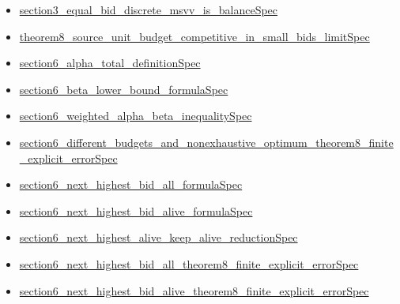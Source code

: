 \documentclass[10pt]{article}
\begin{document}
\begin{itemize}[leftmargin=1.2em]
\begin{itemize}[leftmargin=1.2em]
\item \hyperlink{source-claim-598344e99902b4ae}{section3\_\allowbreak{}equal\_\allowbreak{}bid\_\allowbreak{}discrete\_\allowbreak{}msvv\_\allowbreak{}is\_\allowbreak{}balance\allowbreak{}Spec}
\item \hyperlink{source-claim-87341a8300470279}{theorem8\_\allowbreak{}source\_\allowbreak{}unit\_\allowbreak{}budget\_\allowbreak{}competitive\_\allowbreak{}in\_\allowbreak{}small\_\allowbreak{}bids\_\allowbreak{}limit\allowbreak{}Spec}
\item \hyperlink{source-claim-5bf839489e4b6356}{section6\_\allowbreak{}alpha\_\allowbreak{}total\_\allowbreak{}definition\allowbreak{}Spec}
\item \hyperlink{source-claim-4be68a9e83c05fd2}{section6\_\allowbreak{}beta\_\allowbreak{}lower\_\allowbreak{}bound\_\allowbreak{}formula\allowbreak{}Spec}
\item \hyperlink{source-claim-e7cd47f9b49b64a7}{section6\_\allowbreak{}weighted\_\allowbreak{}alpha\_\allowbreak{}beta\_\allowbreak{}inequality\allowbreak{}Spec}
\item \hyperlink{source-claim-9174699fa51690f5}{section6\_\allowbreak{}different\_\allowbreak{}budgets\_\allowbreak{}and\_\allowbreak{}nonexhaustive\_\allowbreak{}optimum\_\allowbreak{}theorem8\_\allowbreak{}finite\_\allowbreak{}explicit\_\allowbreak{}error\allowbreak{}Spec}
\item \hyperlink{source-claim-a41ed3d927625f21}{section6\_\allowbreak{}next\_\allowbreak{}highest\_\allowbreak{}bid\_\allowbreak{}all\_\allowbreak{}formula\allowbreak{}Spec}
\item \hyperlink{source-claim-e228272600f768f5}{section6\_\allowbreak{}next\_\allowbreak{}highest\_\allowbreak{}bid\_\allowbreak{}alive\_\allowbreak{}formula\allowbreak{}Spec}
\item \hyperlink{source-claim-a231e898ec861552}{section6\_\allowbreak{}next\_\allowbreak{}highest\_\allowbreak{}alive\_\allowbreak{}keep\_\allowbreak{}alive\_\allowbreak{}reduction\allowbreak{}Spec}
\item \hyperlink{source-claim-d7d8eafafd0843a4}{section6\_\allowbreak{}next\_\allowbreak{}highest\_\allowbreak{}bid\_\allowbreak{}all\_\allowbreak{}theorem8\_\allowbreak{}finite\_\allowbreak{}explicit\_\allowbreak{}error\allowbreak{}Spec}
\item \hyperlink{source-claim-4aacac29617d89c4}{section6\_\allowbreak{}next\_\allowbreak{}highest\_\allowbreak{}bid\_\allowbreak{}alive\_\allowbreak{}theorem8\_\allowbreak{}finite\_\allowbreak{}explicit\_\allowbreak{}error\allowbreak{}Spec}

\end{itemize}
\end{itemize}
\end{document}
